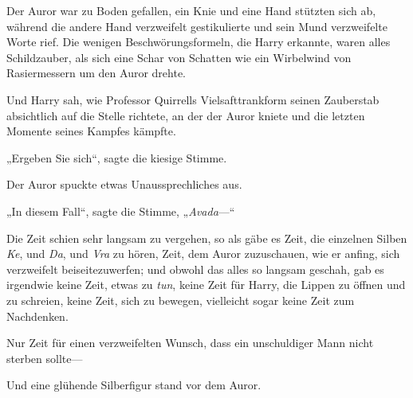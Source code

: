Der Auror war zu Boden gefallen, ein Knie und eine Hand stützten sich ab, während die andere Hand verzweifelt gestikulierte und sein Mund verzweifelte Worte rief. Die wenigen Beschwörungsformeln, die Harry erkannte, waren alles Schildzauber, als sich eine Schar von Schatten wie ein Wirbelwind von Rasiermessern um den Auror drehte.

Und Harry sah, wie Professor Quirrells Vielsafttrankform seinen Zauberstab absichtlich auf die Stelle richtete, an der der Auror kniete und die letzten Momente seines Kampfes kämpfte.

„Ergeben Sie sich“, sagte die kiesige Stimme.

Der Auror spuckte etwas Unaussprechliches aus.

„In diesem Fall“, sagte die Stimme, „\emph{Avada}—“

Die Zeit schien sehr langsam zu vergehen, so als gäbe es Zeit, die einzelnen Silben \emph{Ke}, und \emph{Da}, und \emph{Vra} zu hören, Zeit, dem Auror zuzuschauen, wie er anfing, sich verzweifelt beiseitezuwerfen; und obwohl das alles so langsam geschah, gab es irgendwie keine Zeit, etwas zu \emph{tun}, keine Zeit für Harry, die Lippen zu öffnen und  zu schreien, keine Zeit, sich zu bewegen, vielleicht sogar keine Zeit zum Nachdenken.

Nur Zeit für einen verzweifelten Wunsch, dass ein unschuldiger Mann nicht sterben sollte—

Und eine glühende Silberfigur stand vor dem Auror.

